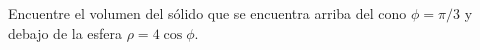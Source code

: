 \item Encuentre el volumen del sólido que se encuentra arriba del cono $\phi = \pi/3$ y debajo de la esfera $\rho = 4 \cos \phi$.
